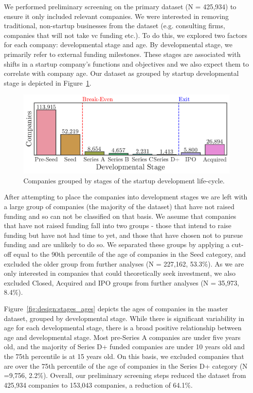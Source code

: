 \documentclass[../thesis/thesis.tex]{subfiles}
\begin{document}
We performed preliminary screening on the primary dataset (N = 425,934) to ensure it only included relevant companies. We were interested in removing traditional, non-startup businesses from the dataset (e.g. consulting firms, companies that will not take \gls{vc} funding etc.). To do this, we explored two factors for each company: developmental stage and age. By developmental stage, we primarily refer to external funding milestones. These stages are associated with shifts in a startup company's functions and objectives and we also expect them to correlate with company age. Our dataset as grouped by startup developmental stage is depicted in Figure~\ref{fig:design:lifecycle}.

\begin{figure}[!htb]
    \centering
    \includegraphics[width=\textwidth]{../figures/design/descriptives_counts_stage}
    \caption[Startup development life-cycle]{Companies grouped by stages of the startup development life-cycle.}
    \label{fig:design:lifecycle}
\end{figure}

After attempting to place the companies into development stages we are left with a large group of companies (the majority of the dataset) that have not raised funding and so can not be classified on that basis. We assume that companies that have not raised funding fall into two groups - those that intend to raise funding but have not had time to yet, and those that have chosen not to pursue funding and are unlikely to do so. We separated these groups by applying a cut-off equal to the 90th percentile of the age of companies in the Seed category, and excluded the older group from further analyses (N = 227,162,  53.3\%). As we are only interested in companies that could theoretically seek investment, we also excluded Closed, Acquired and IPO groups from further analyses (N = 35,973, 8.4\%).

Figure~\ref{fig:design:stages_ages} depicts the ages of companies in the master dataset, grouped by developmental stage. While there is significant variability in age for each developmental stage, there is a broad positive relationship between age and developmental stage. Most pre-Series A companies are under five years old, and the majority of Series D+ funded companies are under 10 years old and the 75th percentile is at 15 years old. On this basis, we excluded companies that are over the 75th percentile of the age of companies in the Series D+ category (N =9,756, 2.2\%). Overall, our preliminary screening steps reduced the dataset from 425,934 companies to 153,043 companies, a reduction of 64.1\%.
\end{document}
